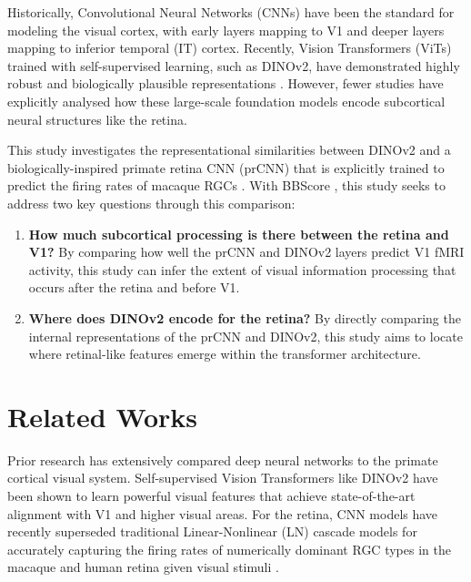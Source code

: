 \documentclass{article}
\begin{document}
Historically, Convolutional Neural Networks (CNNs) have been the standard for
modeling the visual cortex, with early layers mapping to V1 and deeper layers
mapping to inferior temporal (IT) cortex. Recently, Vision Transformers
(ViTs) trained with self-supervised learning, such as DINOv2, have
demonstrated highly robust and biologically plausible representations \cite{oquab_dinov2_2024}. 
However, fewer studies have explicitly analysed how these
large-scale foundation models encode subcortical neural structures like the retina.

This study investigates the representational similarities between DINOv2 
and a biologically-inspired primate retina CNN (prCNN) that is explicitly trained to predict the
firing rates of macaque RGCs \cite{alex_retina_cnn}. 
With BBScore \cite{noauthor_neuroailabbbscore_public_2026}, 
this study seeks to address two key questions through this comparison:
\begin{enumerate}
    \item \textbf{How much subcortical processing is there between the retina
    and V1?} By comparing how well the prCNN and DINOv2 layers predict V1 fMRI
    activity, this study can infer the extent of visual information processing that occurs
    after the retina and before V1.
    \item \textbf{Where does DINOv2 encode for the retina?} By directly
    comparing the internal representations of the prCNN and DINOv2, this study
    aims to locate where retinal-like features emerge within the transformer
    architecture.
\end{enumerate}

\section{Related Works}
Prior research has extensively compared deep neural networks to the primate
cortical visual system. Self-supervised Vision Transformers like DINOv2
\cite{oquab_dinov2_2024} have been shown to learn powerful visual features 
that achieve state-of-the-art alignment with V1 and higher visual areas. 
For the retina, CNN models have recently superseded traditional 
Linear-Nonlinear (LN) cascade models for accurately capturing the firing rates   
of numerically dominant RGC types in the macaque and human retina 
given visual stimuli \cite{alex_retina_cnn}.
\end{document}
